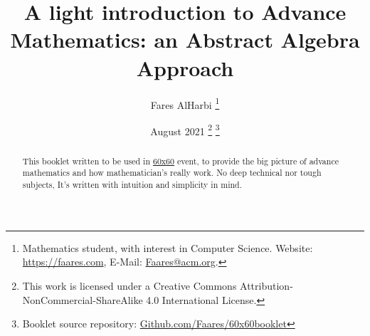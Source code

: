 \documentclass{article}
\title{A light introduction to Advance Mathematics: an Abstract Algebra Approach}
\author{Fares AlHarbi \thanks{Mathematics student, with interest in Computer Science. Website: \href{https://Faares.com}{https://faares.com}, E-Mail: \href{mailto:faares@acm.org}{Faares@acm.org}.} }
\date{August 2021 \footnote{This work is licensed under a Creative Commons Attribution-NonCommercial-ShareAlike 4.0 International License.} \footnote{Booklet source repository: \href{https://github.com/Faares/60x60booklet}{Github.com/Faares/60x60booklet}}}
\begin{document}
\maketitle
\begin{abstract}
    This booklet written to be used in \hyperlink{https://salla.sa/durba/RYePmz}{60x60} event,
    to provide the big picture of advance mathematics and how mathematician's really work.
    No deep technical nor tough subjects, It's written with intuition and simplicity in mind. 
\end{abstract}

\clearpage
\tableofcontents 




\clearpage





\clearpage

\clearpage



\clearpage
\printbibliography[heading=bibintoc]
\end{document}
